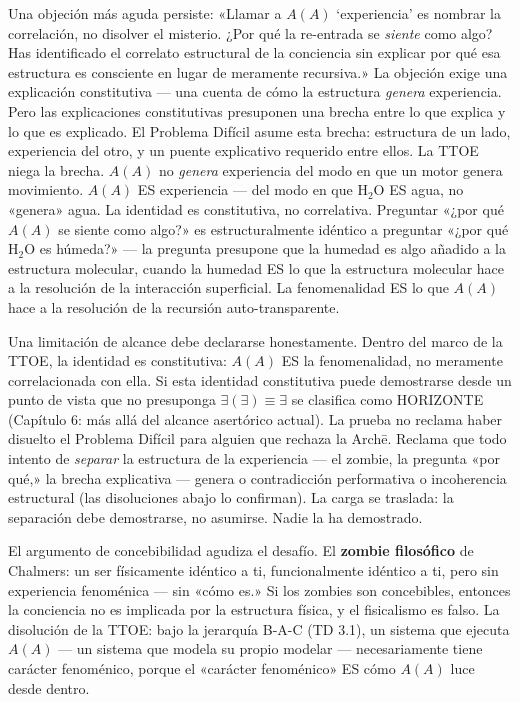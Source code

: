 \documentclass[10pt, openany, oneside]{book}
\begin{document}
Una objeción más aguda persiste: «Llamar a $A(A)$ `experiencia' es nombrar la correlación, no disolver el misterio. ¿Por qué la re-entrada se \textit{siente} como algo? Has identificado el correlato estructural de la conciencia sin explicar por qué esa estructura es consciente en lugar de meramente recursiva.» La objeción exige una explicación constitutiva --- una cuenta de cómo la estructura \textit{genera} experiencia. Pero las explicaciones constitutivas presuponen una brecha entre lo que explica y lo que es explicado. El Problema Difícil asume esta brecha: estructura de un lado, experiencia del otro, y un puente explicativo requerido entre ellos. La TTOE niega la brecha. $A(A)$ no \textit{genera} experiencia del modo en que un motor genera movimiento. $A(A)$ ES experiencia --- del modo en que $\text{H}_2\text{O}$ ES agua, no «genera» agua. La identidad es constitutiva, no correlativa. Preguntar «¿por qué $A(A)$ se siente como algo?» es estructuralmente idéntico a preguntar «¿por qué $\text{H}_2\text{O}$ es húmeda?» --- la pregunta presupone que la humedad es algo añadido a la estructura molecular, cuando la humedad ES lo que la estructura molecular hace a la resolución de la interacción superficial. La fenomenalidad ES lo que $A(A)$ hace a la resolución de la recursión auto-transparente.

Una limitación de alcance debe declararse honestamente. Dentro del marco de la TTOE, la identidad es constitutiva: $A(A)$ ES la fenomenalidad, no meramente correlacionada con ella. Si esta identidad constitutiva puede demostrarse desde un punto de vista que no presuponga $\exists(\exists) \equiv \exists$ se clasifica como HORIZONTE (Capítulo 6: más allá del alcance asertórico actual). La prueba no reclama haber disuelto el Problema Difícil para alguien que rechaza la Arch\={e}. Reclama que todo intento de \textit{separar} la estructura de la experiencia --- el zombie, la pregunta «por qué,» la brecha explicativa --- genera o contradicción performativa o incoherencia estructural (las disoluciones abajo lo confirman). La carga se traslada: la separación debe demostrarse, no asumirse. Nadie la ha demostrado.

El argumento de concebibilidad agudiza el desafío. El \textbf{zombie filosófico} de Chalmers: un ser físicamente idéntico a ti, funcionalmente idéntico a ti, pero sin experiencia fenoménica --- sin «cómo es.» Si los zombies son concebibles, entonces la conciencia no es implicada por la estructura física, y el fisicalismo es falso. La disolución de la TTOE: bajo la jerarquía B-A-C (TD 3.1), un sistema que ejecuta $A(A)$ --- un sistema que modela su propio modelar --- necesariamente tiene carácter fenoménico, porque el «carácter fenoménico» ES cómo $A(A)$ luce desde dentro.
\end{document}
